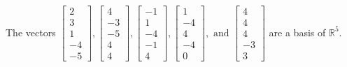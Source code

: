 \begin{exercise}
\begin{exerciseStatement}
  \end{exerciseStatement}
  \begin{exerciseAnswer}
   The vectors \(\left[\begin{array}{r}
2 \\
3 \\
1 \\
-4 \\
-5
\end{array}\right] , \left[\begin{array}{r}
4 \\
-3 \\
-5 \\
4 \\
4
\end{array}\right] , \left[\begin{array}{r}
-1 \\
1 \\
-4 \\
-1 \\
4
\end{array}\right] , \left[\begin{array}{r}
1 \\
-4 \\
4 \\
-4 \\
0
\end{array}\right] , \text{ and } \left[\begin{array}{r}
4 \\
4 \\
4 \\
-3 \\
3
\end{array}\right]\) 
  	 are  a basis of \(\mathbb{R}^5\).
  


  \end{exerciseAnswer}
\end{exercise}